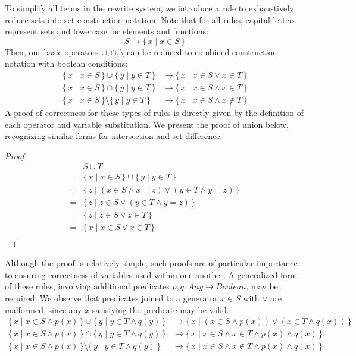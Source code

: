 \documentclass{article}
\newcommand{\Set}[2]{%
  \{\, #1 \mid #2 \, \}%
}
\begin{document}
To simplify all terms in the rewrite system, we introduce a rule to exhaustively reduce sets into set construction notation. Note that for all rules, capital letters represent sets and lowercase for elements and functions:
\begin{equation}
S \rightarrow \Set{x}{x \in S}
\end{equation}
Then, our basic operators $\cup, \cap, \setminus$ can be reduced to combined construction notation with boolean conditions:
\begin{align}
  \Set{x}{x \in S} \cup \Set{y}{y \in T} &\rightarrow \Set{x}{x \in S \lor x \in T}\\
  \Set{x}{x \in S} \cap \Set{y}{y \in T} &\rightarrow \Set{x}{x \in S \land x \in T}\\
  \Set{x}{x \in S} \setminus \Set{y}{y \in T} &\rightarrow \Set{x}{x \in S \land x \notin T}
\end{align}
A proof of correctness for these types of rules is directly given by the definition of each operator and variable substitution. We present the proof of union below, recognizing similar forms for intersection and set difference:
\begin{proof}
  \begin{align*}
    &S \cup T\\
    =&\Set{x}{x \in S} \cup \Set{y}{y \in T}\\
    =&\Set{z}{(x \in S \land x = z) \lor (y \in T \land y = z)}\\
    =&\Set{z}{z \in S \lor (y \in T \land y = z)}\\
    =&\Set{z}{z \in S \lor z \in T}\\
    =&\Set{x}{x \in S \lor x \in T}\\
  \end{align*}
\end{proof}
Although the proof is relatively simple, such proofs are of particular importance to ensuring correctness of variables used within one another. A generalized form of these rules, involving additional predicates $p,q: Any \rightarrow Boolean$, may be required. We observe that predicates joined to a generator $x\in S$ with $\lor$ are malformed, since any $x$ satisfying the predicate may be valid.
\begin{align}
  \Set{x}{x \in S \land p(x)} \cup \Set{y}{y \in T \land q(y)} &\rightarrow \Set{x}{(x \in S \land p(x)) \lor (x \in T  \land q(x))}\\
  \Set{x}{x \in S \land p(x)} \cap \Set{y}{y \in T \land q(y)} &\rightarrow \Set{x}{x \in S \land x \in T \land p(x) \land q(x)}\\
  \Set{x}{x \in S \land p(x)} \setminus \Set{y}{y \in T \land q(y)} &\rightarrow \Set{x}{x \in S \land x \notin T \land p(x) \land q(x)}
\end{align}
\end{document}
